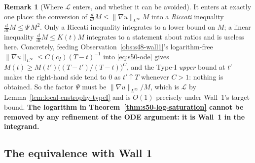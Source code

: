 \documentclass[11pt]{article}
\theoremstyle{definition}
\newtheorem{remark}[theorem]{Remark}
\theoremstyle{remark}
\begin{document}
\begin{remark}[Where $\mathcal{L}$ enters, and whether it can be avoided]
  \label{rem:s50-where-L}
  It enters at exactly one place: the conversion of
  $\frac{d}{dt}M\leq\|\nabla u\|_{L^\infty}M$ into a \emph{Riccati} inequality
  $\frac{d}{dt}M\leq\Psi\,M^2$. Only a Riccati inequality integrates to a
  lower bound on $M$; a linear inequality $\frac{d}{dt}M\leq K(t)M$ integrates
  to a statement about ratios and is useless here. Concretely, feeding
  Observation~\ref{obs:s48-wall1}'s logarithm-free
  $\|\nabla u\|_{L^\infty}\leq C(c_I)(T-t)^{-1}$ into \eqref{eq:s50-ode} gives
  $M(t)\geq M(t')\bigl((T-t')/(T-t)\bigr)^{C}$, and the Type-I \emph{upper}
  bound at $t'$ makes the right-hand side tend to $0$ as $t'\uparrow T$
  whenever $C>1$: nothing is obtained. So the factor $\Psi$ must be
  $\|\nabla u\|_{L^\infty}/M$, which is $\mathcal{L}$ by
  Lemma~\ref{lem:local-enstrophy-typeI} and is $O(1)$ precisely under Wall~1's
  target bound. \textbf{The logarithm in
  Theorem~\ref{thm:s50-log-saturation} cannot be removed by any refinement of
  the ODE argument: it is Wall~1 in the integrand.}
\end{remark}

\subsection{The equivalence with Wall 1}
\label{subsec:s50-equivalence}
\end{document}
